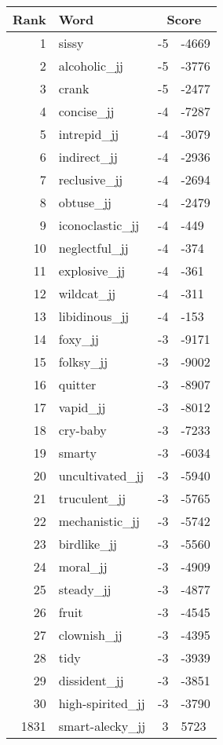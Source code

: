 \begin{longtable}[!htbp]{| rlr@{.}l |}
    \hline
    \textbf{Rank} & \textbf{Word} & \multicolumn{2}{c|}{\textbf{Score}} \\
    \hline
    \endhead
    1 & sissy & -5 & -4669 \\
    2 & alcoholic\_jj & -5 & -3776 \\
    3 & crank & -5 & -2477 \\
    4 & concise\_jj & -4 & -7287 \\
    5 & intrepid\_jj & -4 & -3079 \\
    6 & indirect\_jj & -4 & -2936 \\
    7 & reclusive\_jj & -4 & -2694 \\
    8 & obtuse\_jj & -4 & -2479 \\
    9 & iconoclastic\_jj & -4 & -449 \\
    10 & neglectful\_jj & -4 & -374 \\
    11 & explosive\_jj & -4 & -361 \\
    12 & wildcat\_jj & -4 & -311 \\
    13 & libidinous\_jj & -4 & -153 \\
    14 & foxy\_jj & -3 & -9171 \\
    15 & folksy\_jj & -3 & -9002 \\
    16 & quitter & -3 & -8907 \\
    17 & vapid\_jj & -3 & -8012 \\
    18 & cry-baby & -3 & -7233 \\
    19 & smarty & -3 & -6034 \\
    20 & uncultivated\_jj & -3 & -5940 \\
    21 & truculent\_jj & -3 & -5765 \\
    22 & mechanistic\_jj & -3 & -5742 \\
    23 & birdlike\_jj & -3 & -5560 \\
    24 & moral\_jj & -3 & -4909 \\
    25 & steady\_jj & -3 & -4877 \\
    26 & fruit & -3 & -4545 \\
    27 & clownish\_jj & -3 & -4395 \\
    28 & tidy & -3 & -3939 \\
    29 & dissident\_jj & -3 & -3851 \\
    30 & high-spirited\_jj & -3 & -3790 \\
    1831 & smart-alecky\_jj & 3 & 5723 \\

\end{longtable}
